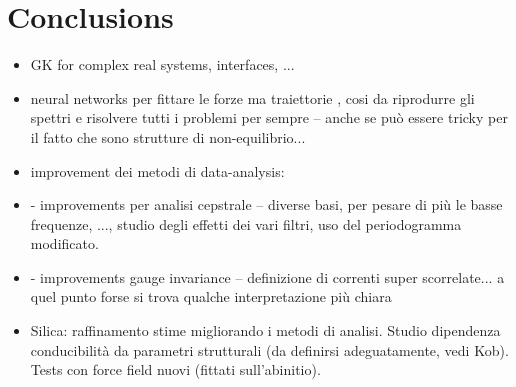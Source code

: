 \chapter{Conclusions}  \label{ch:conclusions}

\begin{itemize}
    \item GK for complex real systems, interfaces, ...
    \item neural networks per fittare le forze ma traiettorie \abinitio, cosi da riprodurre gli spettri e risolvere tutti i problemi per sempre -- anche se pu\`o essere tricky per il fatto che sono strutture di non-equilibrio...
    \item improvement dei metodi di data-analysis:
    \item - improvements per analisi cepstrale -- diverse basi, per pesare di pi\`u le basse frequenze, ..., studio degli effetti dei vari filtri, uso del periodogramma modificato.
    \item - improvements gauge invariance -- definizione di correnti super scorrelate... a quel punto forse si trova qualche interpretazione pi\`u chiara
    \item Silica: raffinamento stime migliorando i metodi di analisi. Studio dipendenza conducibilit\`a da parametri strutturali (da definirsi adeguatamente, vedi Kob). Tests con force field nuovi (fittati sull'abinitio).
\end{itemize}